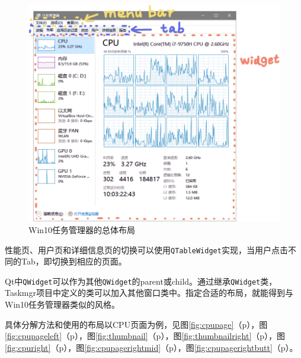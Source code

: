 \documentclass{beamer}
\newcommand\code[1]{\texttt{#1}}
\newcommand\myref[1]{\ref{#1}（p\pageref{#1}）}
\begin{document}
\begin{frame}
\begin{figure}[htb]
    \centering
    \includegraphics[scale=0.3]{../media/layout/总体布局_2.png}
    \caption{Win10任务管理器的总体布局}
    \label{fig:layout}
\end{figure}
\end{frame}

\begin{frame}
性能页、用户页和详细信息页的切换可以使用\code{QTableWidget}实现，当用户点击不同的Tab，即切换到相应的页面。

Qt中\code{QWidget}可以作为其他\code{QWidget}的parent或child。通过继承\code{QWidget}类，Taskmgr项目中定义的类可以加入其他窗口类中。指定合适的布局，就能得到与Win10任务管理器类似的风格。

具体分解方法和使用的布局以CPU页面为例，见图\myref{fig:cpupage}，图\myref{fig:cpupageleft}，图\myref{fig:thumbnail}，图\myref{fig:thumbnailright}，图\myref{fig:cpuright}，图\myref{fig:cpupagerightmid}，图\myref{fig:cpupagerightbutt}。
\end{frame}
\end{document}
